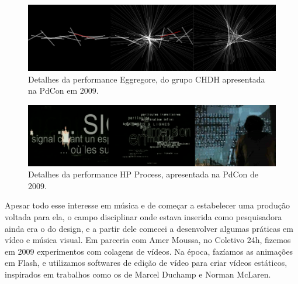 \begin{figure}

\includegraphics[width=1\textwidth]{pictures/cap1/CHDH}
\caption{Detalhes da performance Eggregore, do grupo CHDH apresentada na PdCon em 2009.}
\label{fig:chdh}
\end{figure}

\begin{figure}

\includegraphics[width=1\textwidth]{pictures/cap1/hp1}
\caption{Detalhes da performance HP Process, apresentada na PdCon de 2009.}
\label{fig:hp}
\end{figure}


Apesar todo esse interesse em música e de começar a estabelecer uma produção voltada para ela, o campo disciplinar onde estava inserida como pesquisadora ainda era o do design, e a partir dele comecei a desenvolver algumas práticas em vídeo e música visual. Em parceria com Amer Moussa, no Coletivo 24h, fizemos em 2009 experimentos com colagens de vídeos. Na época, fazíamos as animações em Flash, e utilizamos softwares de edição de vídeo para criar vídeos estáticos, inspirados em trabalhos como os de Marcel Duchamp e Norman McLaren. 


